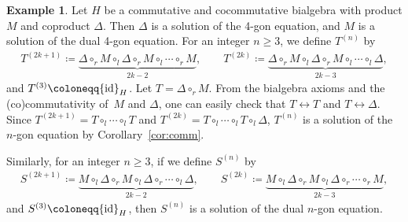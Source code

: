 \documentclass[10pt,a4paper]{amsart}
\numberwithin{equation}{section}
\theoremstyle{definition}
\newtheorem{Example}[Theorem]{Example}
\begin{document}
\begin{Example}\label{ex:ex from comm Hopf}
 Let $H$ be a commutative and cocommutative bialgebra with product $M$ and coproduct $\Delta$.
 Then $\Delta$ is a solution of the 4-gon equation, and $M$ is a solution of the dual 4-gon equation.
 For an integer $n \geq 3$, we define $T^{(n)}$ by
 \begin{align*}
 T^{(2k+1)} \coloneqq \underbrace{\Delta \circ_r M \circ_l \Delta \circ_r M \circ_l \cdots \circ_{r} M}_{2k-2}, \qquad T^{(2k)} \coloneqq \underbrace{\Delta \circ_r M \circ_l \Delta \circ_r M \circ_l \cdots \circ_{l} \Delta}_{2k-3},
 \end{align*}
 and $T^{(3)} \coloneqq {\rm id}_H$.
 Let $T = \Delta \circ_r M$.
 From the bialgebra axioms and the (co)commutativity of~$M$ and $\Delta$, one can easily check that $T\leftrightarrow T$ and $T \leftrightarrow \Delta$.
 Since $T^{(2k+1)}=T\circ_l\cdots \circ_l T$ and $T^{(2k)}=T\circ_l\cdots \circ_l T\circ_l \Delta$, $T^{(n)}$ is a solution of the $n$-gon equation by Corollary~\ref{cor:comm}.

 Similarly, for an integer $n \geq 3$, if we define $S^{(n)}$ by
 \begin{align*}
 S^{(2k+1)} \coloneqq \underbrace{M \circ_l \Delta \circ_r M \circ_l \Delta \circ_r \cdots \circ_l \Delta}_{2k-2}, \qquad S^{(2k)} \coloneqq \underbrace{M \circ_l \Delta \circ_r M \circ_l \Delta \circ_r \cdots \circ_r M}_{2k-3},
 \end{align*}
 and $S^{(3)} \coloneqq {\rm id}_H$, then $S^{(n)}$ is a solution of the dual $n$-gon equation.
\end{Example}
\end{document}

